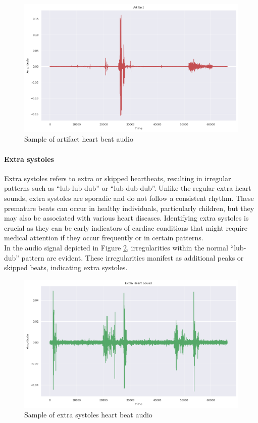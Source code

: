 \begin{figure}[H]
    \centering
    \includegraphics[width=.9\columnwidth]{../images/artifact_heart_beat_audio.png}
    \caption{Sample of artifact heart beat audio }\label{fig:artifact_heart_beat_audio}
\end{figure}

\paragraph{Extra systoles}
Extra systoles refers to extra or skipped heartbeats, resulting in irregular patterns such as ``lub-lub dub'' or ``lub dub-dub''.
Unlike the regular extra heart sounds, extra systoles are sporadic and do not follow a consistent rhythm.
These premature beats can occur in healthy individuals, particularly children, but they may also be associated with various heart diseases.
Identifying extra systoles is crucial as they can be early indicators of cardiac conditions that might require medical attention
if they occur frequently or in certain patterns.\\
In the audio signal depicted in Figure \ref{fig:extrastoles_heart_beat_audio}, irregularities within the normal “lub-dub” pattern are evident.
These irregularities manifest as additional peaks or skipped beats, indicating extra systoles.
\begin{figure}[H]
    \centering
    \includegraphics[width=.9\columnwidth]{../images/extrahls_heart_beat_audio.png}
    \caption{Sample of extra systoles heart beat audio }\label{fig:extrastoles_heart_beat_audio}
\end{figure}

